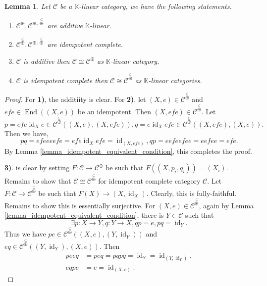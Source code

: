 \documentclass{article}
\newtheorem{lemma}{Lemma}[section]
\numberwithin{equation}{theorem}
\DeclareMathOperator{\End}{End}
\DeclareMathOperator{\id}{id}
\newcommand{\K}[0]{\mathbb{K}}
\newcommand{\cat}[0]{\mathscr{C}}
\newcommand{\summand}[0]{\stackrel{\subseteq}{\oplus}}
\begin{document}
\begin{lemma}
  Let $\cat$ be a $\K$-linear category, we have the following statements.
  \begin{enumerate}[1).]
    \item $\cat^{\oplus},\cat^{\oplus,\summand}$ are additive $\K$-linear.
    \item $\cat^{\summand},\cat^{\oplus,\summand}$ are idempotent complete.
    \item $\cat$ is additive then $\cat\cong \cat^{\oplus}$ as $\K$-linear category.
    \item $\cat$ is idempotent complete then $\cat\cong \cat^{\summand}$ as $\K$-linear categories.
  \end{enumerate}
\end{lemma}

\begin{proof}
    For \textbf{1)}, the additiity is clear. For \textbf{2)}, let $(X,e)\in\cat^{\summand}$ and $efe\in\End((X,e))$ be an idempotent. Then $(X,efe)\in\cat^{\summand}$. Let
    \begin{equation*}
        p=efe\id_Xe\in\cat^{\summand}((X,e),(X,efe)),q=e\id_Xefe\in\cat^{\summand}((X,efe),(X,e)).
    \end{equation*}
    Then we have,
    \begin{equation*}
        pq = efeeeefe = efe \id_X efe = \id_{(X,efe)},qp = eefeefee = eefee=efe.
    \end{equation*}
    By Lemma \ref{lemma_idempotent_equivalent_condition}, this completes the proof.
    \par\textbf{3)}. is clear by setting $F:\cat\to\cat^{\oplus}$ be such that $F((X,p_i,q_i)) = (X_i)$. Remains to show that $\cat\cong\cat^{\summand}$ for idempotent complete category $\cat$. 
    Let $F:\cat\to\cat^{\summand}$ be such that $F(X)\to (X,\id_X)$. Clearly, this is fully-faithful. Remains to show this is essentially surjective. For $(X,e)\in\cat^{\summand}$, again by Lemma \ref{lemma_idempotent_equivalent_condition}, there is $Y\in\cat$ such that 
    \begin{equation*}
        \exists p:X\to Y,q:Y\to X, qp = e,pq = \id_Y.
    \end{equation*}
    Thus we have $pe\in\cat^{\summand}((X,e),(Y,\id_Y))$ and $eq\in\cat^{\summand}((Y,\id_Y),(X,e))$. Then 
    \begin{align*}
        peeq &= peq = pqpq = \id_Y=\id_{(Y,\id_Y)},\\
        eqpe & = e = \id_{(X,e)}.
    \end{align*}
\end{proof}
\end{document}
